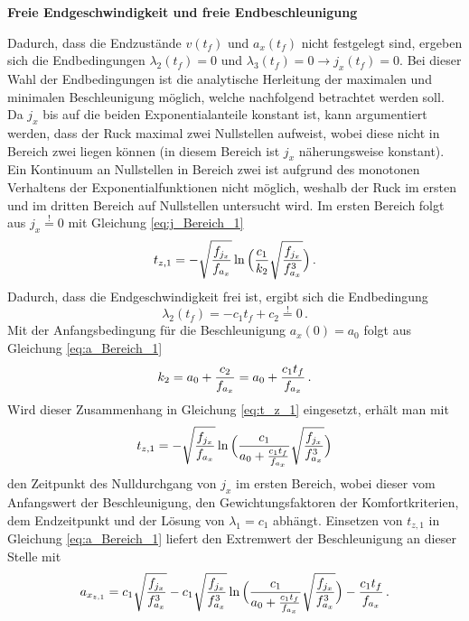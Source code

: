 \textbf{Freie Endgeschwindigkeit und freie Endbeschleunigung}

Dadurch, dass die Endzustände $v(t_f)$ und $a_x(t_f)$ nicht festgelegt sind, ergeben sich die Endbedingungen $\lambda_2(t_f) = 0$ und $\lambda_3(t_f) = 0 \rightarrow j_x(t_f) = 0$. Bei dieser Wahl der Endbedingungen ist die analytische Herleitung der maximalen und minimalen Beschleunigung möglich, welche nachfolgend betrachtet werden soll. Da $j_x$ bis auf die beiden Exponentialanteile konstant ist, kann argumentiert werden, dass der Ruck maximal zwei Nullstellen aufweist, wobei diese nicht in Bereich zwei liegen können (in diesem Bereich ist $j_x$ näherungsweise konstant). Ein Kontinuum an Nullstellen in Bereich zwei ist aufgrund des monotonen Verhaltens der Exponentialfunktionen nicht möglich, weshalb der Ruck im ersten und im dritten Bereich auf Nullstellen untersucht wird. Im ersten Bereich folgt aus $j_x \stackrel{!}{=} 0$ mit Gleichung \eqref{eq:j_Bereich_1}
\begin{equation}
	t_{z,1} = -\sqrt{\frac{f_{j_x}}{f_{a_x}}}\ln{\Big(\frac{c_1}{k_2}\sqrt{\frac{\ensuremath{f_{j_x}}}{\ensuremath{f_{a_x}}^3}}\Big)}\,. \label{eq:t_z_1}
\end{equation}
Dadurch, dass die Endgeschwindigkeit frei ist, ergibt sich die Endbedingung 
\begin{equation}
	\lambda_2(t_f) = -c_1t_f + c_2 \stackrel{!}{=} 0\,.
\end{equation}
Mit der Anfangsbedingung für die Beschleunigung $a_x(0) = a_0$ folgt aus Gleichung \eqref{eq:a_Bereich_1}
\begin{equation}
k_2 = a_0 + \frac{c_2}{f_{a_x}} = a_0 + \frac{c_1t_f}{f_{a_x}}\,.
\end{equation}
Wird dieser Zusammenhang in Gleichung \eqref{eq:t_z_1} eingesetzt, erhält man mit 
\begin{equation}
t_{z,1} = -\sqrt{\frac{f_{j_x}}{f_{a_x}}}\ln{\Big(\frac{c_1}{a_0+\frac{c_1t_f}{\ensuremath{f_{a_x}}}}\sqrt{\frac{\ensuremath{f_{j_x}}}{\ensuremath{f_{a_x}}^3}}\Big)}
\end{equation}
den Zeitpunkt des Nulldurchgang von $j_x$ im ersten Bereich, wobei dieser vom Anfangswert der Beschleunigung, den Gewichtungsfaktoren der Komfortkriterien, dem Endzeitpunkt und der Lösung von $\lambda_1 = c_1$ abhängt. Einsetzen von $t_{z,1}$ in Gleichung \eqref{eq:a_Bereich_1} liefert den Extremwert der Beschleunigung an dieser Stelle mit 
\begin{equation}
a_{x_{z,1}} = c_1\sqrt{\frac{f_{j_x}}{f_{a_x}^3}} -c_1\sqrt{\frac{f_{j_x}}{f_{a_x}^3}}\ln{\Big(\frac{c_1}{a_0+\frac{c_1t_f}{\ensuremath{f_{a_x}}}}\sqrt{\frac{\ensuremath{f_{j_x}}}{\ensuremath{f_{a_x}}^3}}\Big)} - \frac{c_1t_f}{f_{a_x}}\,. 
\end{equation}
